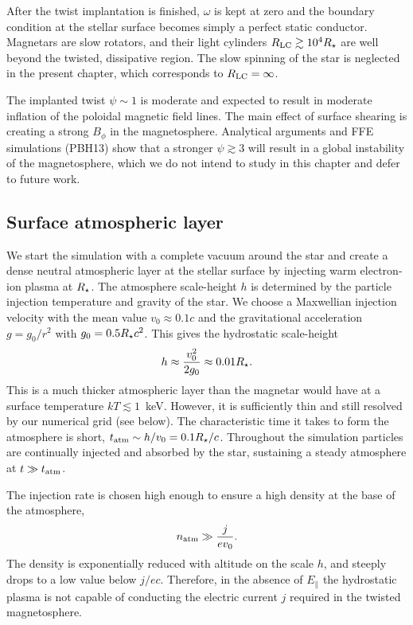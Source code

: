 After the twist implantation is finished, $\omega$ is kept at zero and the
boundary condition at the stellar surface becomes simply a perfect static
conductor. Magnetars are slow rotators, and their light cylinders $R_{\rm
  LC}\gtrsim 10^4R_\star$ are well beyond the twisted, dissipative region. The slow
spinning of the star is neglected in the present chapter, which corresponds to
$R_{\rm LC}=\infty$.

The implanted twist $\psi\sim 1$ is moderate and expected to result
in moderate inflation of the poloidal magnetic field lines. The main effect of surface
shearing is creating a strong $B_\phi$ in the magnetosphere.
Analytical arguments
\citep[e.g.][]{uzdensky_shear-driven_2002} and FFE simulations (PBH13) show that a
stronger $\psi \gtrsim 3$ will result in a global instability of the
magnetosphere, which we do not intend to study in this chapter and defer to future
work.


\subsection{Surface atmospheric layer}
\label{sec:atm}


We start the simulation with a complete vacuum around the star and create
a dense neutral atmospheric layer at the stellar surface by injecting warm electron-ion
plasma at $R_\star$.
The atmosphere scale-height $h$ is determined by the particle injection temperature and
gravity of the star. We choose a Maxwellian injection velocity with the mean value
$v_0\approx 0.1c$ and the gravitational acceleration $g = g_{0}/r^2$ with
$g_0 = 0.5R_\star c^2$. This gives the hydrostatic scale-height
\begin{equation}
  h\approx\frac{v_0^2}{2g_0}\approx 0.01R_\star.
\end{equation}
This is a much thicker atmospheric layer than the magnetar would have at a
surface temperature $kT\lesssim 1$~keV. However, it is sufficiently thin and still
resolved by our numerical grid (see below).
The characteristic time it takes to form the atmosphere is short,
$t_{\rm atm}\sim h/v_0= 0.1 R_\star/c$. Throughout the simulation particles are continually
injected and absorbed by the star, sustaining a steady atmosphere at $t\gg t_{\rm atm}$.

The injection rate is chosen high enough to ensure a high density at the base of
the atmosphere,
\begin{equation}
  n_{\rm atm}\gg \frac{j}{ev_0}.
\end{equation}
The density is exponentially reduced with altitude on the scale $h$, and steeply
drops to a low value below $j/ec$. Therefore, in the absence of $E_\parallel$ the
hydrostatic plasma is not capable of conducting the electric current $j$ required in
the twisted magnetosphere.

